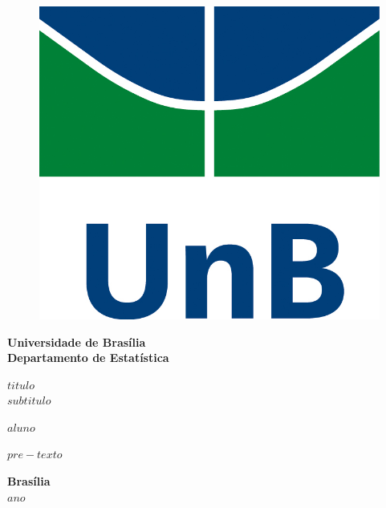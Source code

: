 \documentclass[12pt, a4paper, twoside]{article}
\numberwithin{equation}{subsection} %
\newcommand{\titulo}{$titulo$ \\ $subtitulo$}
\newcommand{\autor}{$aluno$}
\begin{document}
\begin{titlepage}
\begin{center}
\begin{figure}[h!]
	\centering
		\includegraphics[scale = 0.6]{img/as_vert_cor.jpg}
	\label{fig:unb}
\end{figure}
{\bf Universidade de Brasília \\
\bf Departamento de Estatística}
\vspace{4cm}

\setcounter{page}{0}
\null
\textbf{\titulo}
\vspace{2.5cm}


\vspace{0.2cm}
\textbf{\autor}
\end{center}
\vspace{1.5cm}

\begin{flushright}
\begin{minipage}{7.5cm}
\parbox[t]{7.5cm}{$pre-texto$}
\end{minipage}
\end{flushright}

\vspace{5cm}

\begin{center}
{\bf{Brasília} \\ }
\bf{$ano$}
\end{center}
\end{titlepage}
\end{document}
